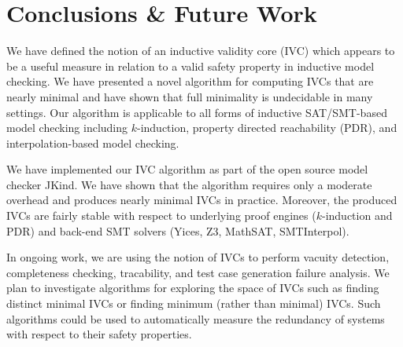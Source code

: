 \section{Conclusions \& Future Work}
\label{sec:conc}

We have defined the notion of an inductive validity core (IVC) which
appears to be a useful measure in relation to a valid safety property
in inductive model checking. We have presented a novel algorithm for
computing IVCs that are nearly minimal and have shown that full
minimality is undecidable in many settings. Our algorithm is
applicable to all forms of inductive SAT/SMT-based model checking
including $k$-induction, property directed reachability (PDR), and
interpolation-based model checking.

We have implemented our IVC algorithm as part of the open source model
checker JKind. We have shown that the algorithm requires only a
moderate overhead and produces nearly minimal IVCs in practice.
Moreover, the produced IVCs are fairly stable with respect to
underlying proof engines ($k$-induction and PDR) and back-end SMT
solvers (Yices, Z3, MathSAT, SMTInterpol).

In ongoing work, we are using the notion of IVCs to perform vacuity
detection, completeness checking, tracability, and test case
generation failure analysis. We plan to investigate algorithms for
exploring the space of IVCs such as finding distinct minimal IVCs or
finding minimum (rather than minimal) IVCs. Such algorithms could be
used to automatically measure the redundancy of systems with respect
to their safety properties.


